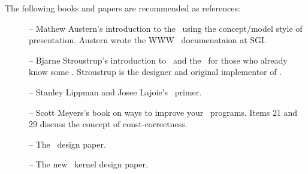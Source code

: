 


The following books and papers are recommended as references:

\begin{description}
   \item[\cite{Austern98}] --  Mathew Austern's introduction to the \stl\ 
        using the concept/model style of presentation.  Austern wrote the 
        WWW \stl\ documenataion at SGI.

   \item[\cite{Stroustrup97}] -- Bjarne Stroustrup's introduction to
        \CC\ and the \stl\ for those who already know some \CC. 
        Stroustrup is the designer and original implementor of \CC.

   \item[\cite{Lippman98}] -- Stanley Lippman and Josee Lajoie's \CC\ primer.

   \item[\cite{Meyers97}] -- Scott Meyers's book on ways to improve
        your \CC\ programs.  Items 21 and 29 discuss the concept of 
        const-correctness.

  \item [\cite{Fabri98}] -- The \cgal\ design paper. 

  \item [\cite{hhkps-aegk-01}] -- The new \cgal\ kernel design paper. 
\end{description}

\InternalOnly{

}

